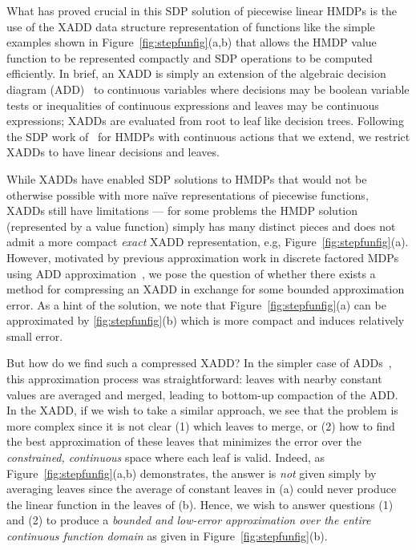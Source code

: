What has proved crucial in this SDP solution of piecewise linear HMDPs
is the use of the XADD data structure representation of functions like
the simple examples shown in Figure~\ref{fig:stepfunfig}(a,b) that
allows the HMDP value function to be represented compactly and SDP
operations to be computed efficiently.  In brief, an XADD is simply an
extension of the algebraic decision diagram (ADD)~\cite{bahar93add} to
continuous variables where decisions may be boolean variable tests or
inequalities of continuous expressions and leaves may be continuous
expressions; XADDs are evaluated from root to leaf like decision
trees.  Following the SDP work of~\cite{zamani12} for HMDPs with
continuous actions that we extend, we restrict XADDs to have linear
decisions and leaves.

While XADDs have enabled SDP solutions to HMDPs that would not be
otherwise possible with more na\"{i}ve representations of piecewise
functions, XADDs still have limitations --- for some problems the HMDP
solution (represented by a value function) simply has many distinct
pieces and does not admit a more compact \emph{exact} XADD
representation, e.g, Figure~\ref{fig:stepfunfig}(a).  However,
motivated by previous approximation work in discrete factored MDPs
using ADD approximation~\cite{apricodd}, we pose the question of
whether there exists a method for compressing an XADD in exchange
for some bounded approximation error.  As a hint of the solution, we
note that Figure~\ref{fig:stepfunfig}(a) can be approximated
by \ref{fig:stepfunfig}(b) which is more compact and induces relatively 
small error.  

But how do we find such a compressed XADD?  In the simpler case of
ADDs~\cite{apricodd}, this approximation process was straightforward:
leaves with nearby constant values are averaged and merged, leading to
bottom-up compaction of the ADD.  In the XADD, if we wish to take a
similar approach, we see that the problem is more complex since it is
not clear (1) which leaves to merge, or (2) how to find the best
approximation of these leaves that minimizes the error over the
\emph{constrained, continuous} space where each leaf is valid.  Indeed, as
Figure~\ref{fig:stepfunfig}(a,b) demonstrates, the answer
is \emph{not} given simply by averaging leaves since the average of
constant leaves in (a) could never produce the linear function in the
leaves of (b).  Hence, we wish to answer questions (1) and (2) to
produce a \emph{bounded and low-error approximation over the entire
continuous function domain} as given in
Figure~\ref{fig:stepfunfig}(b).


